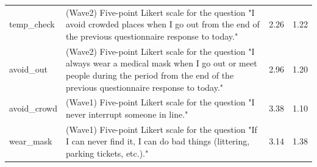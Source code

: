 \documentclass[
]{article}
\begin{document}
\begin{table}[!h]
\begin{tabular}[t]{l>{\raggedright\arraybackslash}p{30em}cc}
temp\_check & (Wave2) Five-point Likert scale for the question "I avoid crowded places when I go out from the end of the previous questionnaire response to today." & \num{2.26} & \num{1.22}\\
avoid\_out & (Wave2) Five-point Likert scale for the question "I always wear a medical mask when I go out or meet people during the period from the end of the previous questionnaire response to today." & \num{2.96} & \num{1.20}\\
avoid\_crowd & (Wave1) Five-point Likert scale for the question "I never interrupt someone in line." & \num{3.38} & \num{1.10}\\
wear\_mask & (Wave1) Five-point Likert scale for the question "If I can never find it, I can do bad things (littering, parking tickets, etc.)." & \num{3.14} & \num{1.38}\\
\bottomrule
\end{tabular}
\end{table}
\end{document}
